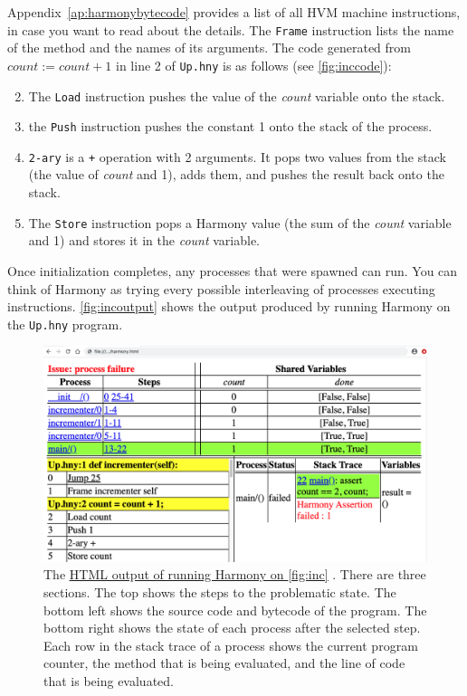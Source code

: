 \documentclass{report}
\newcommand{\harmonyref}[2]{%
\href{https://www.cs.cornell.edu/home/rvr/harmony/output/#1}{\underline{#2}}%
}
\begin{document}
Appendix~\ref{ap:harmonybytecode} provides a list of all HVM machine instructions,
in case you want to read about the details.
The \texttt{Frame} instruction lists the name of the method and the
names of its arguments.
The code generated from $\mathit{count} := \mathit{count} + 1$ in line 2 of
\texttt{Up.hny} is as follows (see \autoref{fig:inccode}):

\begin{enumerate} \setcounter{enumi}{1}
\item The \texttt{Load} instruction pushes the value of the
\textit{count} variable onto the stack.
\item the \texttt{Push} instruction pushes the constant 1
onto the stack of the process.
\item \texttt{2-ary} is a \texttt{+} operation with 2 arguments.
It pops two values from the stack (the value of \textit{count} and 1),
adds them, and pushes the result back onto the stack.
\item The \texttt{Store} instruction pops
a Harmony value (the sum of the \textit{count} variable and 1) and
stores it in the \textit{count} variable.
\end{enumerate}

Once initialization completes, any processes that were spawned can run.
You can think of Harmony as trying every possible interleaving of processes executing
instructions.
\autoref{fig:incoutput} shows the output produced by running Harmony on the
\texttt{Up.hny} program.

\begin{figure}
\includegraphics[width=\textwidth]{figures/Up1.png}
\caption{The
\harmonyref{Up.html}{HTML output of running Harmony on \autoref{fig:inc}}.
There are three sections.
The top shows the steps to the problematic state.
The bottom left shows the source code and bytecode
of the program.
The bottom right shows the state of each process after the selected step.
Each row in the stack trace of a process shows the current program counter,
the method that is being evaluated, and the line of code that is
being evaluated.}
\label{fig:inchtml1}
\end{figure}
\end{document}
